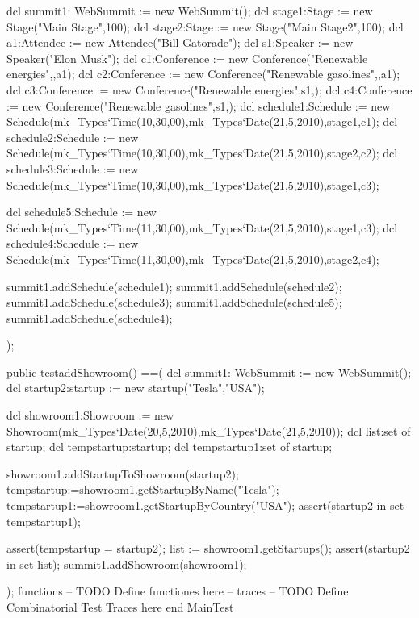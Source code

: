 \begin{vdmpp}[breaklines=true]
 dcl summit1: WebSummit := new WebSummit();
   dcl stage1:Stage := new Stage("Main Stage",100);
   dcl stage2:Stage := new Stage("Main Stage2",100);
   dcl a1:Attendee := new Attendee("Bill Gatorade");
   dcl s1:Speaker := new Speaker("Elon Musk");
   dcl c1:Conference := new Conference("Renewable energies",{},{a1});
   dcl c2:Conference := new Conference("Renewable gasolines",{},{a1});
   dcl c3:Conference := new Conference("Renewable energies",{s1},{});
   dcl c4:Conference := new Conference("Renewable gasolines",{s1},{});    
   dcl schedule1:Schedule := new Schedule(mk_Types`Time(10,30,00),mk_Types`Date(21,5,2010),stage1,c1);
   dcl schedule2:Schedule := new Schedule(mk_Types`Time(10,30,00),mk_Types`Date(21,5,2010),stage2,c2);
   dcl schedule3:Schedule := new Schedule(mk_Types`Time(10,30,00),mk_Types`Date(21,5,2010),stage1,c3);
   
   dcl schedule5:Schedule := new Schedule(mk_Types`Time(11,30,00),mk_Types`Date(21,5,2010),stage1,c3);
   dcl schedule4:Schedule := new Schedule(mk_Types`Time(11,30,00),mk_Types`Date(21,5,2010),stage2,c4);
  
  summit1.addSchedule(schedule1);
  summit1.addSchedule(schedule2);
  summit1.addSchedule(schedule3);
  summit1.addSchedule(schedule5);
  summit1.addSchedule(schedule4);
  
  
    
 
 );
 
 public testaddShowroom() ==(
 dcl summit1: WebSummit := new WebSummit();
 dcl startup2:startup := new startup("Tesla","USA");
 
 dcl showroom1:Showroom := new Showroom(mk_Types`Date(20,5,2010),mk_Types`Date(21,5,2010));
 dcl list:set of startup;
 dcl tempstartup:startup;
 dcl tempstartup1:set of startup;
 
 showroom1.addStartupToShowroom(startup2);
 tempstartup:=showroom1.getStartupByName("Tesla");
 tempstartup1:=showroom1.getStartupByCountry("USA");
 assert(startup2 in set tempstartup1);
 
 assert(tempstartup = startup2);
 list := showroom1.getStartups();
 assert(startup2 in set list);
 summit1.addShowroom(showroom1);
 
 );
functions
-- TODO Define functiones here
--
traces
-- TODO Define Combinatorial Test Traces here
end MainTest
\end{vdmpp}
